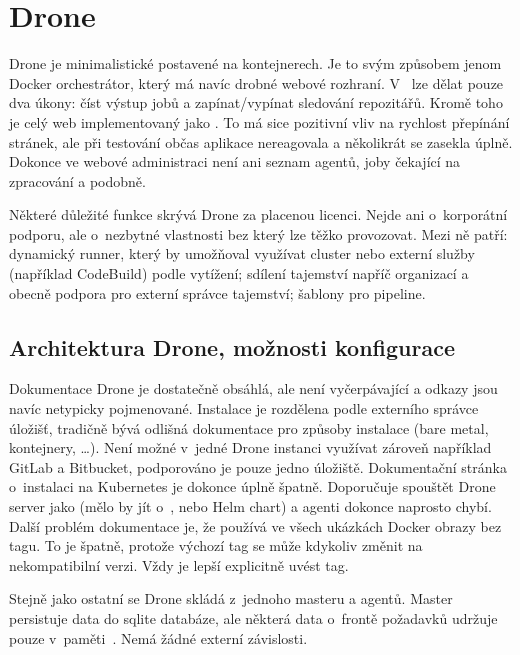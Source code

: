 \section{Drone}
    Drone je minimalistické \CI postavené na kontejnerech. Je to svým způsobem jenom Docker orchestrátor, který má navíc drobné webové rozhraní. V~ lze dělat pouze dva úkony: číst výstup jobů a zapínat/vypínat sledování repozitářů. Kromě toho je celý web implementovaný jako . To má sice pozitivní vliv na rychlost přepínání stránek, ale při testování občas aplikace nereagovala a několikrát se zasekla úplně. Dokonce ve webové administraci není ani seznam agentů, joby čekající na zpracování a podobně.

    Některé důležité funkce skrývá Drone za placenou licenci. Nejde ani o~korporátní podporu, ale o~nezbytné vlastnosti bez který lze \CI těžko provozovat. Mezi ně patří: dynamický runner, který by umožňoval využívat cluster nebo externí služby (například  CodeBuild) podle vytížení; sdílení tajemství napříč organizací a obecně podpora pro externí správce tajemství; šablony pro pipeline.

    \subsection{Architektura Drone, možnosti konfigurace}
        Dokumentace Drone je dostatečně obsáhlá, ale není vyčerpávající a odkazy jsou navíc netypicky pojmenované. Instalace je rozdělena podle externího správce úložišť, tradičně bývá odlišná dokumentace pro způsoby instalace (bare metal, kontejnery, \ldots). Není možné v~jedné Drone instanci využívat zároveň například GitLab a Bitbucket, podporováno je pouze jedno úložiště. Dokumentační stránka o~instalaci na Kubernetes je dokonce úplně špatně. Doporučuje spouštět Drone server jako  (mělo by jít o~, nebo Helm chart) a agenti dokonce naprosto chybí. Další problém dokumentace je, že používá ve všech ukázkách Docker obrazy bez tagu. To je špatně, protože výchozí tag  se může kdykoliv změnit na nekompatibilní verzi. Vždy je lepší explicitně uvést tag.

        Stejně jako ostatní \CI se Drone skládá z~jednoho masteru a agentů. Master persistuje data do sqlite databáze, ale některá data o~frontě požadavků udržuje pouze v~paměti~\cite{drone-ha}. Nemá žádné externí závislosti.

